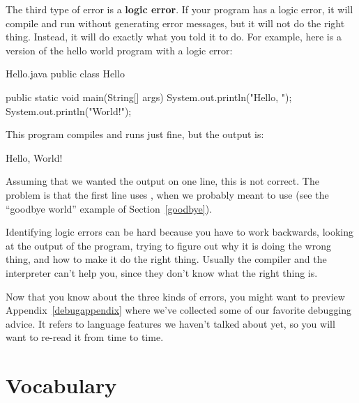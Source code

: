 
The third type of error is a {\bf logic error}.
If your program has a logic error, it will compile and run without generating error messages, but it will not do the right thing.
Instead, it will do exactly what you told it to do.
For example, here is a version of the hello world program with a logic error:

\begin{trinket}[235]{Hello.java}
public class Hello {

    public static void main(String[] args) {
        System.out.println("Hello, ");
        System.out.println("World!");
    }
}
\end{trinket}

This program compiles and runs just fine, but the output is:

\begin{stdout}
Hello,
World!
\end{stdout}

Assuming that we wanted the output on one line, this is not correct.
The problem is that the first line uses , when we probably meant to use  (see the ``goodbye world'' example of Section~\ref{goodbye}).

Identifying logic errors can be hard because you have to work backwards, looking at the output of the program, trying to figure out why it is doing the wrong thing, and how to make it do the right thing.
Usually the compiler and the interpreter can't help you, since they don't know what the right thing is.

Now that you know about the three kinds of errors, you might want to preview Appendix~\ref{debugappendix} where we've collected some of our favorite debugging advice.
It refers to language features we haven't talked about yet, so you will want to re-read it from time to time.


\section{Vocabulary}

